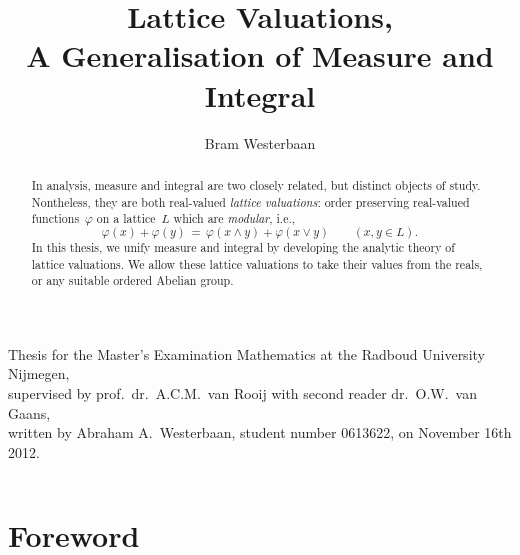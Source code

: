 \documentclass[main.tex]{subfiles}
\begin{document}
\title[A Generalisation of Measure and Integral]{Lattice Valuations,\\
A Generalisation of Measure and Integral}

\author[A.A.~Westerbaan]{Bram Westerbaan}
\maketitle


\vspace{1cm}


\vfill
\noindent
{\tiny
Thesis for the Master's Examination
Mathematics at the Radboud University Nijmegen,\\
supervised by prof.~dr.~A.C.M.~van Rooij
with second reader dr.~O.W.~van Gaans,\\
written by Abraham A.~Westerbaan, 
student number 0613622,
on November 16th 2012.

}
\clearpage
$\,$
\newpage
\begin{abstract}
In analysis,
measure and integral are two closely related,
but distinct objects of study.
Nontheless,
they are both real-valued \emph{lattice valuations}:
order preserving real-valued functions~$\varphi$
on a lattice~$L$
which are \emph{modular}, i.e.,
\begin{equation*}
\varphi(x) + \varphi(y) 
\,=\, 
\varphi(x\wedge y) + \varphi(x\vee y)\qquad(x,y\in L).
\end{equation*}
In this thesis,
we unify measure and integral
by developing the analytic theory of lattice valuations.
We allow these lattice valuations
to take their values from the reals,
or any suitable ordered Abelian group.
\end{abstract}

\clearpage
%
%
\section*{Foreword}
\clearpage
\tableofcontents
\clearpage
\end{document}
